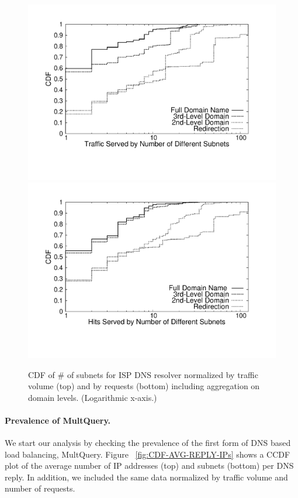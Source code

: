 \begin{figure}[htbp]
  \center
   \includegraphics[height=0.7\linewidth]{figures-pdf/SubnetsByBytes}
   \includegraphics[height=0.7\linewidth]{figures-pdf/SubnetsByHits}
  \caption{CDF of \# of subnets for ISP DNS resolver normalized by traffic
    volume  (top) and by requests (bottom) including aggregation on
    domain levels. (Logarithmic x-axis.)}
  \label{fig:CDF-IPPAF-Subnets}
\end{figure}

\paragraph{Prevalence of MultQuery.} We start our analysis by checking the
prevalence of the first form of DNS based load balancing, MultQuery. Figure~
\ref{fig:CDF-AVG-REPLY-IPs} shows a CCDF plot of the average number of IP
addresses (top) and subnets (bottom) per DNS reply. In addition, we included
the same data normalized by traffic volume and number of requests.

